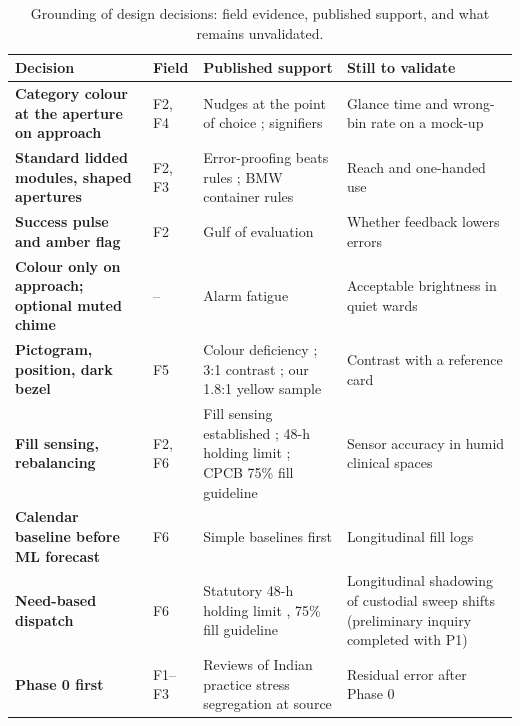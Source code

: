 \documentclass[10pt,twocolumn,a4paper]{article}
\begin{document}
\begin{table}[!t]
\centering\footnotesize
\caption{Grounding of design decisions: field evidence, published support, and what remains unvalidated.}\label{tab:ground}
\begin{tabularx}{\textwidth}{@{}>{\bfseries}p{3.2cm} p{1.6cm} Y Y@{}}
\toprule
Decision & Field & Published support & Still to validate\\\midrule
Category colour at the aperture on approach & F2, F4 & Nudges at the point of choice \cite{thaler2008}; signifiers \cite{norman2013} & Glance time and wrong-bin rate on a mock-up\\
Standard lidded modules, shaped apertures & F2, F3 & Error-proofing beats rules \cite{shingo1986}; BMW container rules \cite{bmw2016} & Reach and one-handed use\\
Success pulse and amber flag & F2 & Gulf of evaluation \cite{norman2013} & Whether feedback lowers errors\\
Colour only on approach; optional muted chime & -- & Alarm fatigue \cite{sendelbach2013,wickens2013} & Acceptable brightness in quiet wards\\
Pictogram, position, dark bezel & F5 & Colour deficiency \cite{birch2012}; 3:1 contrast \cite{wcag2023}; our 1.8:1 yellow sample & Contrast with a reference card\\
Fill sensing, rebalancing & F2, F6 & Fill sensing established \cite{medvedev2015}; 48-h holding limit \cite{bmw2016}; CPCB 75\% fill guideline \cite{cpcb2018guidelines} & Sensor accuracy in humid clinical spaces\\
Calendar baseline before ML forecast & F6 & Simple baselines first \cite{hyndman2021} & Longitudinal fill logs\\
Need-based dispatch & F6 & Statutory 48-h holding limit \cite{bmw2016}, 75\% fill guideline \cite{cpcb2018guidelines} & Longitudinal shadowing of custodial sweep shifts (preliminary inquiry completed with P1)\\
Phase 0 first & F1--F3 & Reviews of Indian practice stress segregation at source \cite{datta2018,capoor2017} & Residual error after Phase 0\\
\bottomrule
\end{tabularx}
\end{table}
\end{document}
